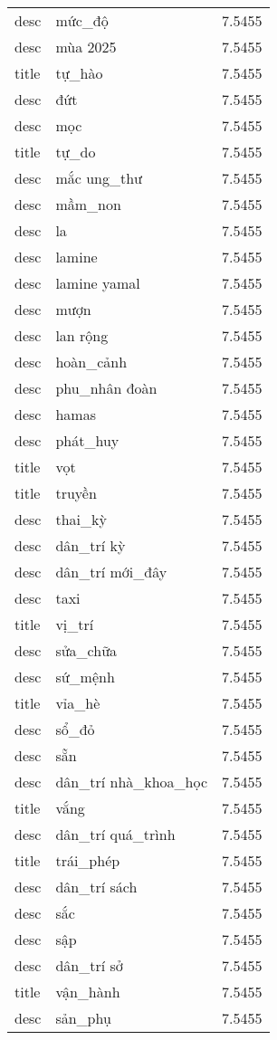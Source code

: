 \documentclass{article}
\begin{document}
\begin{tabular}{lll}
desc & mức\_độ & 7.5455\\
desc & mùa 2025 & 7.5455\\
title & tự\_hào & 7.5455\\
desc & đứt & 7.5455\\
desc & mọc & 7.5455\\
title & tự\_do & 7.5455\\
desc & mắc ung\_thư & 7.5455\\
desc & mầm\_non & 7.5455\\
desc & la & 7.5455\\
desc & lamine & 7.5455\\
desc & lamine yamal & 7.5455\\
desc & mượn & 7.5455\\
desc & lan rộng & 7.5455\\
desc & hoàn\_cảnh & 7.5455\\
desc & phu\_nhân đoàn & 7.5455\\
desc & hamas & 7.5455\\
desc & phát\_huy & 7.5455\\
title & vọt & 7.5455\\
title & truyền & 7.5455\\
desc & thai\_kỳ & 7.5455\\
desc & dân\_trí kỳ & 7.5455\\
desc & dân\_trí mới\_đây & 7.5455\\
desc & taxi & 7.5455\\
title & vị\_trí & 7.5455\\
desc & sửa\_chữa & 7.5455\\
desc & sứ\_mệnh & 7.5455\\
title & vỉa\_hè & 7.5455\\
desc & sổ\_đỏ & 7.5455\\
desc & sẵn & 7.5455\\
desc & dân\_trí nhà\_khoa\_học & 7.5455\\
title & vắng & 7.5455\\
desc & dân\_trí quá\_trình & 7.5455\\
title & trái\_phép & 7.5455\\
desc & dân\_trí sách & 7.5455\\
desc & sắc & 7.5455\\
desc & sập & 7.5455\\
desc & dân\_trí sở & 7.5455\\
title & vận\_hành & 7.5455\\
desc & sản\_phụ & 7.5455\\

\end{tabular}
\end{document}
